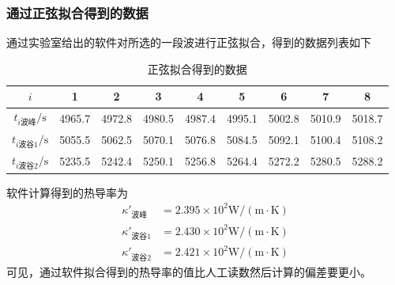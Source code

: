 \documentclass{ctexart}
\begin{document}
	\subsubsection{通过正弦拟合得到的数据}
	通过实验室给出的软件对所选的一段波进行正弦拟合，得到的数据列表如下
	\begin{table}[H]
		\begin{center}
			\caption{正弦拟合得到的数据}
			\begin{tabular}{c|cccccccc}
				$i$&1&2&3&4&5&6&7&8\\
				\hline
				$t_{i\text{波峰}}/\text{s}$&4965.7&4972.8&4980.5&4987.4&4995.1&5002.8&5010.9&5018.7\\
				\hline
				$t_{i\text{波谷1}}/\text{s}$&5055.5&5062.5&5070.1&5076.8&5084.5&5092.1&5100.4&5108.2\\
				\hline
				$t_{i\text{波谷2}}/\text{s}$&5235.5&5242.4&5250.1&5256.8&5264.4&5272.2&5280.5&5288.2
			\end{tabular}
		\end{center}
	\end{table}
	软件计算得到的热导率为
	\begin{align}
		\kappa'_\text{波峰}&=2.395\times 10^2 \mathrm{W/(m\cdot K)}\\
		\kappa'_\text{波谷1}&=2.430\times 10^2 \mathrm{W/(m\cdot K)}\\
		\kappa'_\text{波谷2}&=2.421\times 10^2 \mathrm{W/(m\cdot K)}
	\end{align}
	可见，通过软件拟合得到的热导率的值比人工读数然后计算的偏差要更小。
\end{document}
